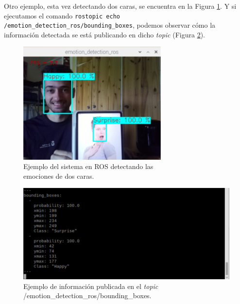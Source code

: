 Otro ejemplo, esta vez detectando dos caras, se encuentra en la Figura \ref{fig:ventana_grafica_2_caras}. Y si ejecutamos el comando \verb|rostopic echo /emotion_detection_ros/bounding_boxes|, podemos observar cómo la información detectada se está publicando en dicho \textit{topic} (Figura \ref{fig:ejemplo_salida_topic}).\\

\begin{figure} [h!]
  \begin{center}
    \includegraphics[width=75mm]{figs/prediccion_happy_surprise.png}
  \end{center}
  \captionsetup{justification=centering}
  \caption{Ejemplo del sistema en ROS detectando las\\
  emociones de dos caras.}
  \label{fig:ventana_grafica_2_caras}
\end{figure}

\begin{figure} [h!]
  \begin{center}
    \includegraphics[width=13cm]{figs/salida_topic.png}
  \end{center}
  \captionsetup{justification=centering}
  \caption{Ejemplo de información publicada en el \textit{topic}\\
  /emotion\_detection\_ros/bounding\_boxes.}
  \label{fig:ejemplo_salida_topic}
\end{figure}

